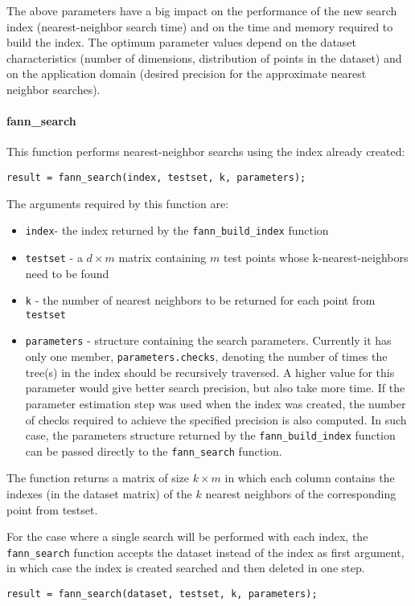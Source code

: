 \documentclass[letter,10pt]{article}
\begin{document}
The above parameters have a big impact on the performance of the new search index (nearest-neighbor search time) and on the time and memory required to build the index. The optimum parameter values depend on the dataset characteristics (number of dimensions, distribution of points in the dataset) and on the application domain (desired precision for the approximate nearest neighbor searches).


\paragraph{fann\_search}

This function performs nearest-neighbor searchs using the index already created:
\begin{Verbatim}
result = fann_search(index, testset, k, parameters);
\end{Verbatim}

The arguments required by this function are:
\begin{itemize}
 \item \texttt{index}- the index returned by the \texttt{fann\_build\_index} function
 \item \texttt{testset} - a $d \times m$ matrix containing $m$ test points whose k-nearest-neighbors need to be found
 \item \texttt{k} - the number of nearest neighbors to be returned for each point from \texttt{testset}
\item \texttt{parameters} - structure containing the search parameters. Currently it has only one member, \texttt{parameters.checks}, denoting the number of times the tree(s) in the index should be recursively traversed. A higher value for this parameter would give better search precision, but also take more time. If the parameter estimation step was used when the index was created, the number of checks required to achieve the specified precision is also computed. In such case, the parameters structure returned by the \texttt{fann\_build\_index} function can be passed directly to the \texttt{fann\_search} function.
\end{itemize}

The function returns a matrix of size $k \times m$ in which each column contains the indexes (in the dataset matrix) of the $k$ nearest neighbors of the corresponding point from testset.

For the case where a single search will be performed with each index, the \texttt{fann\_search} function accepts the dataset instead of the index as first argument, in which case the index is created searched and then deleted in one step.
\begin{Verbatim}
result = fann_search(dataset, testset, k, parameters);
\end{Verbatim}
\end{document}
